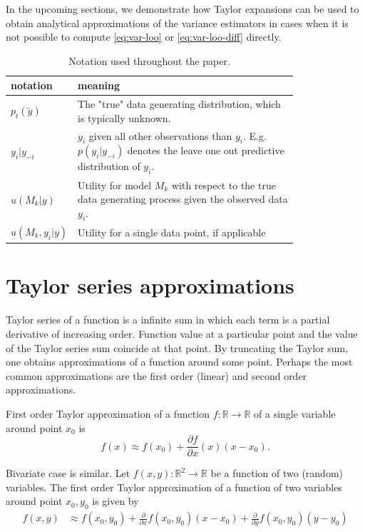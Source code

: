 \documentclass{article}
\begin{document}
In the upcoming sections, we demonstrate how Taylor expansions can be used to obtain analytical approximations of the variance estimators in cases when it is not possible to compute \eqref{eq:var-loo} or \eqref{eq:var-loo-diff} directly. 

\begin{table}[!htb]
    \centering
    \begin{tabular}{l | p{0.8\linewidth}}
    \toprule
        notation & meaning \\ \midrule
        $p_t(\tilde{y})$ & The "true" data generating distribution, which is typically unknown. \\
        $y_i | y_{-i}$ & $y_i$ given all other observations than $y_i$. E.g. $p(y_i | y_{-i})$ denotes the leave one out predictive distribution of $y_i$. \\
        $ u(M_k | y) $ & Utility for model $M_k$ with respect to the true data generating process given the observed data $y_i$. \\
        $u(M_k, y_i | y)$ & Utility for a single data point, if applicable
        
    \end{tabular}
    \caption{Notation used throughout the paper.}
    \label{tab:notation}
\end{table}

\section{Taylor series approximations}
Taylor series of a function is a infinite sum in which each term is a partial derivative of increasing order. Function value at a particular point and the value of the Taylor series sum coincide at that point. By truncating the Taylor sum, one obtains approximations of a function around some point. Perhaps the most common approximations are the first order (linear) and second order approximations.

First order Taylor approximation of a function $f: \mathbb{R} \rightarrow \mathbb{R}$ of a single variable around point $x_0$ is
\begin{equation*}
    f(x) \approx f(x_0) + \frac{\partial f}{\partial x}(x)(x-x_0) \label{eq:tapprox1d}.
\end{equation*}

Bivariate case is similar. Let $f(x, y): \mathbb{R}^2 \rightarrow \mathbb{R}$ be a function of two (random) variables. The first order Taylor approximation of a function of two variables around point $x_0, y_0$ is given by
\begin{align*}
    f(x, y) &\approx f(x_0, y_0) + \frac{\partial }{\partial x} f(x_0, y_0) (x - x_0) + \frac{\partial }{\partial y} f(x_0, y_0) (y - y_0) \label{eq:tapprox2d}
\end{align*}
\end{document}
